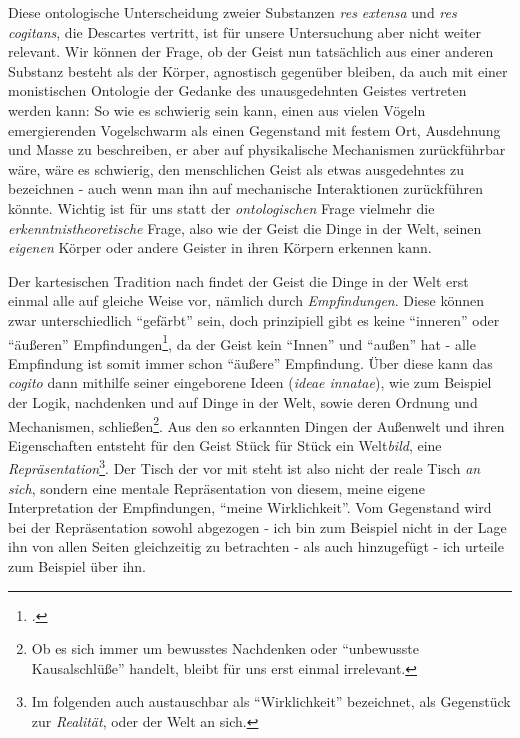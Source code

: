 \documentclass[a4paper, 12pt]{article}
\begin{document}
\begin{onehalfspace}
Diese ontologische Unterscheidung zweier Substanzen \emph{res extensa} und \emph{res cogitans}, die Descartes vertritt, ist für unsere Untersuchung aber nicht weiter relevant. Wir können der Frage, ob der Geist nun tatsächlich aus einer anderen Substanz besteht als der Körper, agnostisch gegenüber bleiben, da auch mit einer monistischen Ontologie der Gedanke des unausgedehnten Geistes vertreten werden kann: So wie es schwierig sein kann, einen aus vielen Vögeln emergierenden Vogelschwarm als einen Gegenstand mit festem Ort, Ausdehnung und Masse zu beschreiben, er aber auf physikalische Mechanismen zurückführbar wäre, wäre es schwierig, den menschlichen Geist als etwas ausgedehntes zu bezeichnen - auch wenn man ihn auf mechanische Interaktionen zurückführen könnte. Wichtig ist für uns statt der \emph{ontologischen} Frage vielmehr die \emph{erkenntnistheoretische} Frage, also wie der Geist die Dinge in der Welt, seinen \emph{eigenen} Körper oder andere Geister in ihren Körpern erkennen kann.


Der kartesischen Tradition nach findet der Geist die Dinge in der Welt erst einmal alle auf gleiche Weise vor, nämlich durch \emph{Empfindungen}. Diese können zwar unterschiedlich "`gefärbt"' sein, doch prinzipiell gibt es keine "`inneren"' oder "`äußeren"' Empfindungen\footnote{\Cite[Vgl.][S. ?? (501?)]{scheler-ethik}.}, da der Geist kein "`Innen"' und "`außen"' hat - alle Empfindung ist somit immer schon "`äußere"' Empfindung. Über diese kann das \emph{cogito} dann mithilfe seiner eingeborene Ideen (\emph{ideae innatae}), wie zum Beispiel der Logik, nachdenken und auf Dinge in der Welt, sowie deren Ordnung und Mechanismen, schließen\footnote{Ob es sich immer um bewusstes Nachdenken oder "`unbewusste Kausalschlüße"' handelt, bleibt für uns erst einmal irrelevant.}. Aus den so erkannten Dingen der Außenwelt und ihren Eigenschaften entsteht für den Geist Stück für Stück ein Welt\emph{bild}, eine \emph{Repräsentation}\footnote{Im folgenden auch austauschbar als "`Wirklichkeit"' bezeichnet, als Gegenstück zur \emph{Realität}, oder der Welt an sich.}. Der Tisch der vor mit steht ist also nicht der reale Tisch \emph{an sich}, sondern eine mentale Repräsentation von diesem, meine eigene Interpretation der Empfindungen, "`meine Wirklichkeit"'. Vom Gegenstand wird bei der Repräsentation sowohl abgezogen - ich bin zum Beispiel nicht in der Lage ihn von allen Seiten gleichzeitig zu betrachten - als auch hinzugefügt - ich urteile zum Beispiel über ihn.


\end{onehalfspace}
\end{document}
